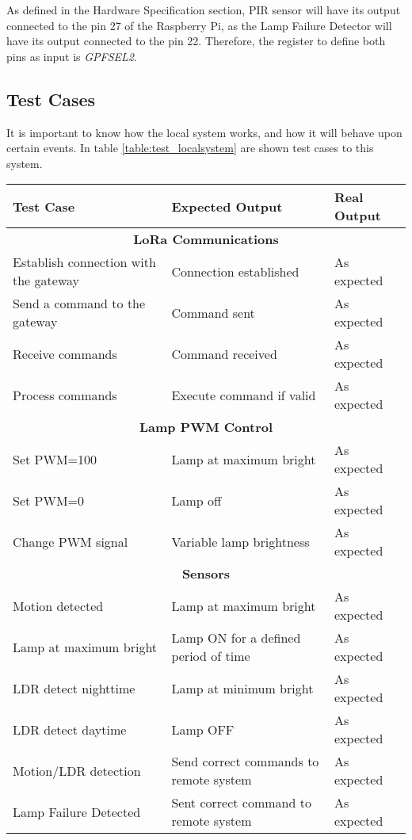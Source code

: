 As defined in the Hardware Specification section, PIR sensor will have its output connected to the pin 27 of the Raspberry Pi, as the Lamp Failure Detector will have its output connected to the pin 22. Therefore, the register to define both pins as input is \textit{GPFSEL2}.

\clearpage
\subsection{Test Cases}
It is important to know how the local system works, and how it will behave upon certain events. In table \ref{table:test_localsystem} are shown test cases to this system.

\begin{table}[H]
	\centering
	\resizebox{\columnwidth}{!}
	{
		\begin{tabular}{|m{4cm}|m{5cm}||m{5cm}|}
			\hline
			\textbf{Test Case} & \textbf{Expected Output} & \textbf{Real Output}
			\\\hline\hline
			\multicolumn{3}{c}{\textbf{LoRa Communications}}\\\hline
			Establish connection with the gateway & Connection established & As expected
			\\\hline
			Send a command to the gateway & Command sent & As expected
			\\\hline
			Receive commands & Command received & As expected
			\\\hline
			Process commands & Execute command if valid & As expected
			\\\hline
			
			\multicolumn{3}{c}{\textbf{Lamp PWM Control}}\\\hline
			Set PWM=100 & Lamp at maximum bright & As expected
			\\\hline
			Set PWM=0 & Lamp off & As expected
			\\\hline
			Change PWM signal & Variable lamp brightness & As expected
			\\\hline
			
			\multicolumn{3}{c}{\textbf{Sensors}}\\\hline
			Motion detected & Lamp at maximum bright & As expected
			\\\hline
			Lamp at maximum bright & Lamp ON for a defined period of time & As expected
			\\\hline
			LDR detect nighttime & Lamp at minimum bright & As expected
			\\\hline
			LDR detect daytime & Lamp OFF & As expected
			\\\hline
			Motion/LDR detection & Send correct commands to remote system & As expected
			\\\hline
			Lamp Failure Detected & Sent correct command to remote system & As expected
			\\\hline
			

\end{tabular}}
\end{table}
